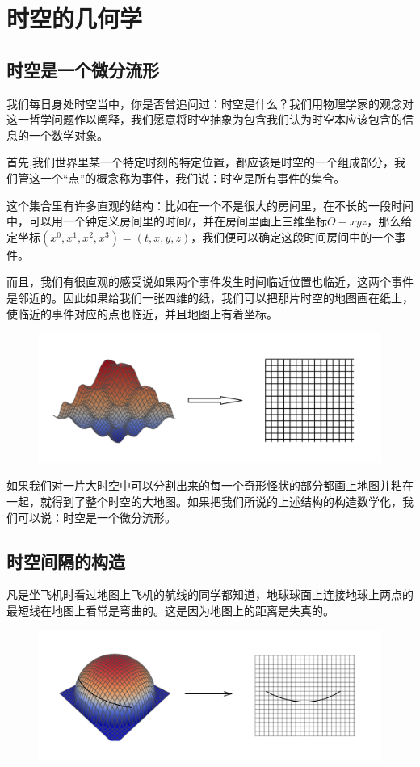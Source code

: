 \documentclass{article}
\begin{document}
\section{时空的几何学}
\subsection{时空是一个微分流形}
我们每日身处时空当中，你是否曾追问过：时空是什么？我们用物理学家的观念对这一哲学问题作以阐释，我们愿意将时空抽象为包含我们认为时空本应该包含的信息的一个数学对象。

首先,我们世界里某一个特定时刻的特定位置，都应该是时空的一个组成部分，我们管这一个“点”的概念称为事件，我们说：时空是所有事件的集合。

这个集合里有许多直观的结构：比如在一个不是很大的房间里，在不长的一段时间中，可以用一个钟定义房间里的时间$t$，并在房间里画上三维坐标$O-xyz$，那么给定坐标$(x^0,x^1,x^2,x^3)=(t,x,y,z)$，我们便可以确定这段时间房间中的一个事件。

而且，我们有很直观的感受说如果两个事件发生时间临近位置也临近，这两个事件是邻近的。因此如果给我们一张四维的纸，我们可以把那片时空的地图画在纸上，使临近的事件对应的点也临近，并且地图上有着坐标。

\begin{figure}[htbp]
    \centering
    \includegraphics[scale=0.4]{1.png}
\end{figure}

如果我们对一片大时空中可以分割出来的每一个奇形怪状的部分都画上地图并粘在一起，就得到了整个时空的大地图。如果把我们所说的上述结构的构造数学化，我们可以说：时空是一个微分流形。

\subsection{时空间隔的构造}
凡是坐飞机时看过地图上飞机的航线的同学都知道，地球球面上连接地球上两点的最短线在地图上看常是弯曲的。这是因为地图上的距离是失真的。

\begin{figure}[htbp]
    \centering
    \includegraphics[scale=0.3]{2.png}
\end{figure}
\end{document}
